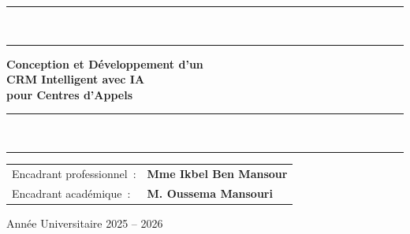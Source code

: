 \begin{titlepage}
    \noindent\rule{\linewidth}{1pt}\\[2pt]
    \noindent\rule{\linewidth}{0.4pt}

    \vspace{0.5cm}

    \begin{center}
        {\large\bfseries
            Conception et D\'eveloppement d'un\\[4pt]
            CRM Intelligent avec IA\\[4pt]
            pour Centres d'Appels
        }
    \end{center}

    \vspace{0.5cm}
    \noindent\rule{\linewidth}{0.4pt}\\[2pt]
    \noindent\rule{\linewidth}{1pt}

    \vspace{1cm}

    \begin{flushleft}
        \hspace{2cm}
        \begin{tabular}{@{}ll}
            Encadrant professionnel~: & \textbf{Mme Ikbel Ben Mansour} \\[4pt]
            Encadrant académique~:    & \textbf{M. Oussema Mansouri} \\
        \end{tabular}
    \end{flushleft}

    \vfill

    \begin{center}
        Année Universitaire 2025 -- 2026
    \end{center}

    \vspace*{0.3cm}

\end{titlepage}
